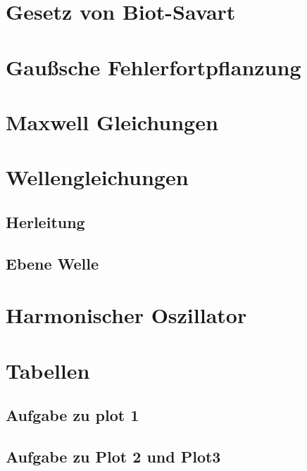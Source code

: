 



  \maketitle
  \tableofcontents
  \newpage

  \section{Gesetz von Biot-Savart}
      

  \section{Gaußsche Fehlerfortpflanzung}
      

  \section{Maxwell Gleichungen}
      

  \section{Wellengleichungen}

    \subsection{Herleitung}
        
        \subsection{Ebene Welle}
        

  \section{Harmonischer Oszillator}
    

    \newpage

  \section{Tabellen}
    \subsection{Aufgabe zu plot 1}
    

    \newpage
    
    \subsection{Aufgabe zu Plot 2 und Plot3}
    

